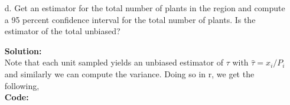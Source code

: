 \documentclass[12pt]{article}
\makeatletter
\theoremstyle{homework}
\newenvironment{exercise}[1]
{\def\@currentlabel{#1}\exercisecore}
{\endexercisecore}
\newcommand{\localhead}[1]{\par\smallskip\noindent\textbf{#1}\nobreak\\}%
\newcommand\solution{\localhead{Solution:}}
\makeatother
\begin{document}
\begin{exercise}{4}
\begin{enumerate}
       \item[d.] Get an estimator for the total number of plants in the region and compute a 95 percent confidence interval for the total number of plants.  Is the estimator of the total unbiased?\\
       \solution Note that each unit sampled yields an unbiased estimator of $\tau$ with $\hat{\tau} = x_i/ P_i$ and similarly we can compute the variance. 
       Doing so in r, we get the following, \\
       \textbf{Code:}
       \begin{center}
          
       \end{center}
       \vspace{1in}





  \end{enumerate}



  
\end{exercise}
\end{document}
